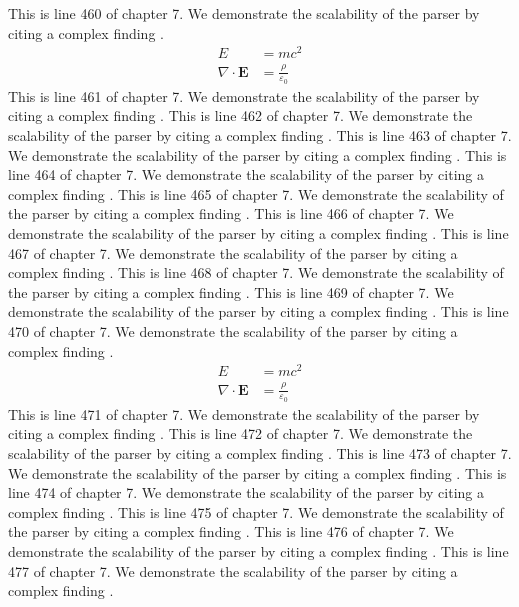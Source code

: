 This is line 460 of chapter 7. We demonstrate the scalability of the parser by citing a complex finding \cite{ref7_460}.
\begin{align*}
  E &= mc^2 \\
  \nabla \cdot \mathbf{E} &= \frac{\rho}{\varepsilon_0}
\end{align*}
This is line 461 of chapter 7. We demonstrate the scalability of the parser by citing a complex finding \cite{ref7_461}.
This is line 462 of chapter 7. We demonstrate the scalability of the parser by citing a complex finding \cite{ref7_462}.
This is line 463 of chapter 7. We demonstrate the scalability of the parser by citing a complex finding \cite{ref7_463}.
This is line 464 of chapter 7. We demonstrate the scalability of the parser by citing a complex finding \cite{ref7_464}.
This is line 465 of chapter 7. We demonstrate the scalability of the parser by citing a complex finding \cite{ref7_465}.
This is line 466 of chapter 7. We demonstrate the scalability of the parser by citing a complex finding \cite{ref7_466}.
This is line 467 of chapter 7. We demonstrate the scalability of the parser by citing a complex finding \cite{ref7_467}.
This is line 468 of chapter 7. We demonstrate the scalability of the parser by citing a complex finding \cite{ref7_468}.
This is line 469 of chapter 7. We demonstrate the scalability of the parser by citing a complex finding \cite{ref7_469}.
This is line 470 of chapter 7. We demonstrate the scalability of the parser by citing a complex finding \cite{ref7_470}.
\begin{align*}
  E &= mc^2 \\
  \nabla \cdot \mathbf{E} &= \frac{\rho}{\varepsilon_0}
\end{align*}
This is line 471 of chapter 7. We demonstrate the scalability of the parser by citing a complex finding \cite{ref7_471}.
This is line 472 of chapter 7. We demonstrate the scalability of the parser by citing a complex finding \cite{ref7_472}.
This is line 473 of chapter 7. We demonstrate the scalability of the parser by citing a complex finding \cite{ref7_473}.
This is line 474 of chapter 7. We demonstrate the scalability of the parser by citing a complex finding \cite{ref7_474}.
This is line 475 of chapter 7. We demonstrate the scalability of the parser by citing a complex finding \cite{ref7_475}.
This is line 476 of chapter 7. We demonstrate the scalability of the parser by citing a complex finding \cite{ref7_476}.
This is line 477 of chapter 7. We demonstrate the scalability of the parser by citing a complex finding \cite{ref7_477}.
